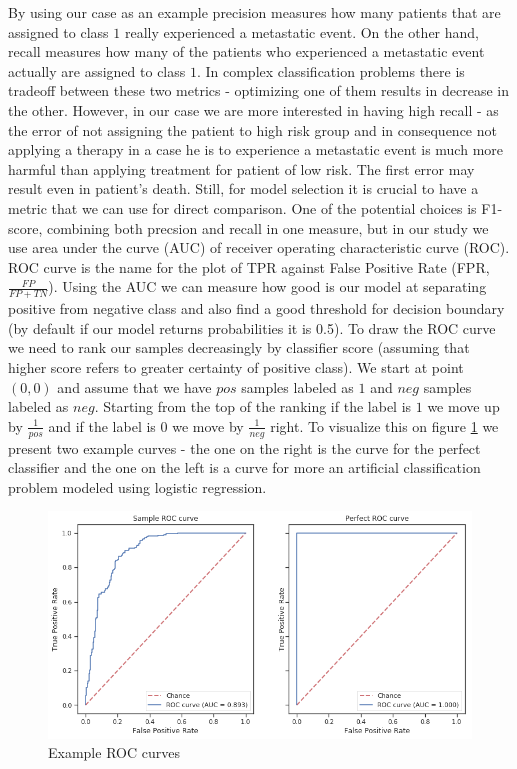 \documentclass[shortabstract, english, mgr]{iithesis}
\begin{document}
By using our case as an example precision measures how many patients that are assigned to class $1$ really experienced a metastatic event. On the other hand, recall measures how many of the patients who experienced a metastatic event actually are assigned to class $1$. In complex classification problems there is tradeoff between these two metrics - optimizing one of them results in decrease in the other. However, in our case we are more interested in having high recall - as the error of not assigning the patient to high risk group and in consequence not applying a therapy in a case he is to experience a metastatic event is much more harmful than applying treatment for patient of low risk. The first error may result even in patient's death. Still, for model selection it is crucial to have a metric that we can use for direct comparison. One of the potential choices is F1-score, combining both precsion and recall in one measure, but in our study we use area under the curve (AUC) of receiver operating characteristic curve (ROC). ROC curve is the name for the plot of TPR against False Positive Rate (FPR, $\frac{FP}{FP + TN}$). Using the AUC we can measure how good is our model at separating positive from negative class and also find a good threshold for decision boundary (by default if our model returns probabilities it is 0.5). To draw the ROC curve we need to rank our samples decreasingly by classifier score (assuming that higher score refers to greater certainty of positive class). We start at point $(0,0)$ and assume that we have $pos$ samples labeled as $1$ and $neg$ samples labeled as $neg$. Starting from the top of the ranking if the label is $1$ we move up by $\frac{1}{pos}$ and if the label is $0$ we move by $\frac{1}{neg}$ right. To visualize this on figure \ref{fig:roc} we present two example curves - the one on the right is the curve for the perfect classifier and the one on the left is a curve for more an artificial classification problem modeled using logistic regression.

\begin{figure}
\centering
\includegraphics[width=\textwidth]{images/rocExample.png}
\caption{Example ROC curves}
\label{fig:roc}
\end{figure}
\end{document}
